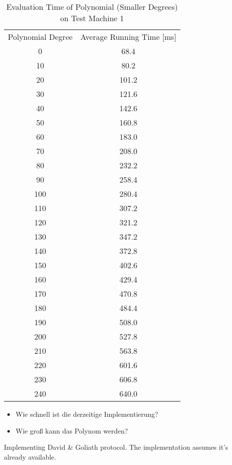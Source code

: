 \begin{table}[ht]
  \centering
  \begin{tabular}{|c|c|}
    Polynomial Degree & Average Running Time [ms] \\
    0  & 68.4 \\
    10 &  80.2 \\
    20 & 101.2 \\
    30 & 121.6 \\
    40 & 142.6 \\
    50 & 160.8 \\
    60 & 183.0 \\
    70 & 208.0 \\
    80 & 232.2 \\
    90 & 258.4 \\
    100 & 280.4 \\
    110 & 307.2 \\
    120 & 321.2 \\
    130 & 347.2 \\
    140 & 372.8 \\
    150 & 402.6 \\
    160 & 429.4 \\
    170 & 470.8 \\
    180 & 484.4 \\
    190 & 508.0 \\
    200 & 527.8 \\
    210 & 563.8 \\
    220 & 601.6 \\
    230 & 606.8 \\
    240 & 640.0 \\
  \end{tabular}
  \caption{Evaluation Time of Polynomial (Smaller Degrees) on Test Machine 1}
  \label{tab:poly-deg-t-small}
\end{table}

\begin{JWtodoBox}

\begin{itemize}

\item Wie schnell ist die derzeitige Implementierung?

\item Wie groß kann das Polynom werden?

\end{itemize}

\end{JWtodoBox}



Implementing David \& Goliath protocol. The implementation assumes it's already
available.

